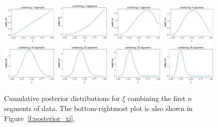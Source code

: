 \begin{figure}[htbp!]
\begin{center}
\includegraphics[width=0.24\textwidth]{Figures/posterior_xi_cum_0}
\includegraphics[width=0.24\textwidth]{Figures/posterior_xi_cum_1}
\includegraphics[width=0.24\textwidth]{Figures/posterior_xi_cum_2}
\includegraphics[width=0.24\textwidth]{Figures/posterior_xi_cum_3}
\includegraphics[width=0.24\textwidth]{Figures/posterior_xi_cum_9}
\includegraphics[width=0.24\textwidth]{Figures/posterior_xi_cum_19}
\includegraphics[width=0.24\textwidth]{Figures/posterior_xi_cum_29}
\includegraphics[width=0.24\textwidth]{Figures/posterior_xi_cum_39}
\caption{Cumulative posterior distributions for $\xi$ combining the
first $n$ segments of data.
The bottom-rightmost plot is also shown in Figure~\ref{f:posterior_xi}.}
\label{f:posteriors_xi_cum}
\end{center}
\end{figure}

